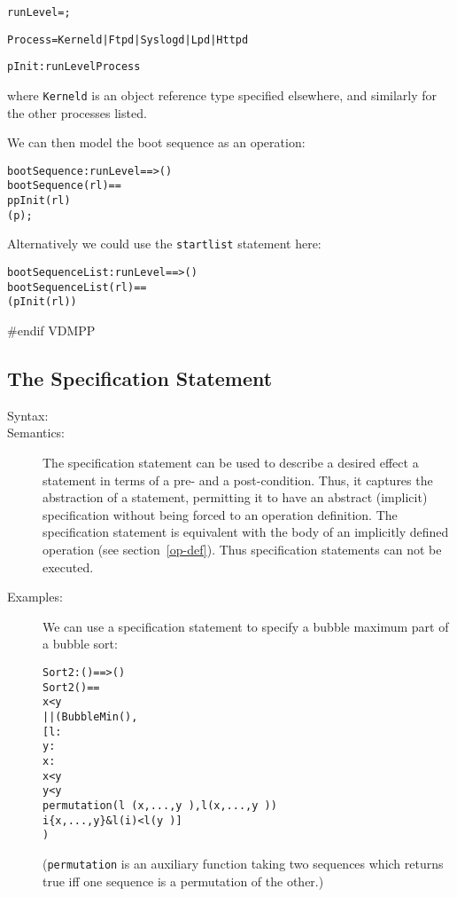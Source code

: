 \documentclass[\pformat,12pt]{article}
\begin{document}
\begin{description}
\begin{alltt}
    runLevel = ;

    Process = Kerneld | Ftpd | Syslogd | Lpd | Httpd

    pInit :  runLevel  Process
\end{alltt}
where \texttt{Kerneld} is an object reference type specified
elsewhere, and similarly for the other processes listed. 

We can then model the boot sequence as an operation:
\begin{alltt}
    bootSequence : runLevel ==> ()
    bootSequence(rl) ==
       p  pInit(rl) 
        (p);
\end{alltt}
Alternatively we could use the \texttt{startlist} statement here:
\begin{alltt}
    bootSequenceList : runLevel ==> ()
    bootSequenceList(rl) ==
      (pInit(rl))
\end{alltt}
\end{description}
#endif VDMPP

\subsection{The Specification Statement} \label{se:specification}

\begin{description}
\item[Syntax:] 

\item[Semantics:] 

The specification statement can be used to describe a desired effect a
statement in terms of a pre- and a post-condition. Thus, it captures
the abstraction of a statement, permitting it to have an abstract
(implicit) specification without being forced to an operation
definition. The specification statement is equivalent with the body of
an implicitly defined operation (see section~\ref{op-def}). Thus
specification statements can not be executed.

\item[Examples:] We can use a specification statement to specify a
  bubble maximum part of a bubble sort:
  \begin{alltt}
  Sort2 : () ==> ()
  Sort2 () ==
     x < y 
      || (BubbleMin(),
          [ l : 
               y : 
               x : 
            x < y
            y < y~ 
                permutation (l~(x,...,y~),l(x,...,y~)) 
                 i  \{x,...,y\} & l(i) < l(y~)]
         )
  \end{alltt}
  (\texttt{permutation} is an auxiliary function taking two sequences
  which returns true iff one sequence is a permutation of the other.)


\end{description}
\end{document}

